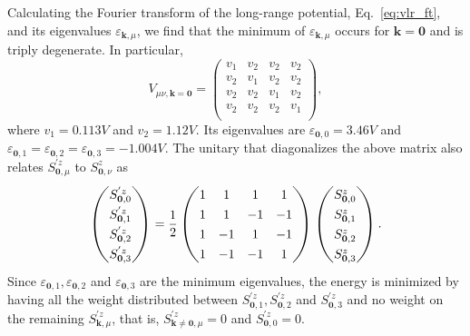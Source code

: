 \documentclass[twocolumn,superscriptaddress,amsmath,amssymb,aps,prx,nofootinbib]{revtex4-2}
\begin{document}
Calculating the Fourier transform of the long-range potential, Eq.~\eqref{eq:vlr_ft}, and its eigenvalues $\varepsilon_{\mathbf{k},\mu}$, we find that the minimum of $\varepsilon_{\mathbf{k},\mu}$ occurs for $\mathbf{k} =\boldsymbol{0}$ and is triply degenerate. In particular,
\begin{equation} \label{eq:Vk0_matrix}
  V_{\mu\nu,\mathbf{k}=\boldsymbol{0}} = 
  \begin{pmatrix}
    v_1 & v_2 & v_2 & v_2\\
    v_2 & v_1 & v_2 & v_2\\
    v_2 & v_2 & v_1 & v_2\\
    v_2 & v_2 & v_2 & v_1\\
  \end{pmatrix},
\end{equation}
where $v_1 = 0.113 V$ and $v_2 =1.12 V$. Its eigenvalues are $\varepsilon_{\boldsymbol{0},0} = 3.46V$ and $\varepsilon_{\boldsymbol{0},1}=\varepsilon_{\boldsymbol{0},2}=\varepsilon_{\boldsymbol{0},3} = -1.004 V$. The unitary that diagonalizes the above matrix also relates $S^{'z}_{\boldsymbol{0},\mu}$ to $S^{z}_{\boldsymbol{0},\nu}$ as 
\begin{equation} \label{eq:s_to_s_prime}
\renewcommand\arraystretch{1.3}
  \begin{pmatrix}
    S^{'z}_{\boldsymbol{0},0} \\ 
    S^{'z}_{\boldsymbol{0},1} \\ 
    S^{'z}_{\boldsymbol{0},2} \\ 
    S^{'z}_{\boldsymbol{0},3} \\ 
  \end{pmatrix} 
  = \frac{1}{2} 
  \begin{pmatrix}
    1 &  1 &  1 &  1 \\
    1 &  1 & -1 & -1 \\
    1 & -1 &  1 & -1 \\
    1 & -1 & -1 &  1 \\
  \end{pmatrix} 
  \begin{pmatrix}
    S^{z}_{\boldsymbol{0},0} \\ 
    S^{z}_{\boldsymbol{0},1} \\ 
    S^{z}_{\boldsymbol{0},2} \\ 
    S^{z}_{\boldsymbol{0},3} \\ 
  \end{pmatrix}.
\end{equation}
Since $\varepsilon_{\boldsymbol{0},1},\varepsilon_{\boldsymbol{0},2}$ and $\varepsilon_{\boldsymbol{0},3}$ are the minimum eigenvalues, the energy is minimized by having all the weight distributed between $S^{'z}_{\boldsymbol{0},1}, S^{'z}_{\boldsymbol{0},2}$ and $S^{'z}_{\boldsymbol{0},3}$ and no weight on the remaining $S^{'z}_{\mathbf{k},\mu}$, that is, $S^{'z}_{\mathbf{k}\neq\boldsymbol{0},\mu} = 0$ and $S^{'z}_{\boldsymbol{0},0} = 0$. 
\end{document}
